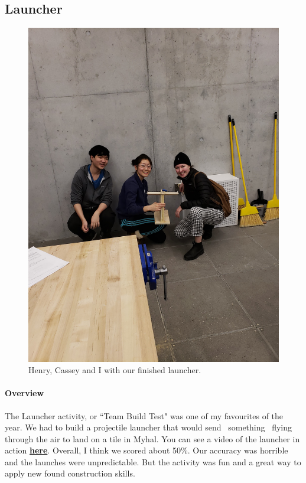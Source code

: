 \documentclass[paper=a4, fontsize=11pt]{article} %
\begin{document}
    \subsection{Launcher}
    \begin{figure}[H]
        \centering
        \includegraphics[width=0.53\linewidth]{launch3.jpg}
        \caption{Henry, Cassey and I with our finished launcher.}
    \end{figure}
    \paragraph{Overview}
    The Launcher activity, or ``Team Build Test" was one of my favourites of the year. We had to build a projectile launcher that would send ~something~ flying through the air to land on a tile in Myhal. You can see a video of the launcher in action \href{https://youtu.be/uYIhF1Nd8Os}{\textbf{here}}. Overall, I think we scored about 50\%. Our accuracy was horrible and the launches were unpredictable. But the activity was fun and a great way to apply new found construction skills. 
\end{document}
